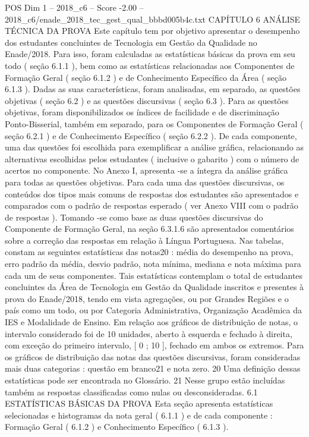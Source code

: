 \begin{textsample}{POS Dim 1 – 2018\_c6 – Score -2.00 – 2018\_c6/enade\_2018\_tec\_gest\_qual\_bbbd005b4c.txt}  \label{ex:f1_pos_247}
CAPÍTULO 6 ANÁLISE TÉCNICA DA PROVA Este capítulo tem por objetivo apresentar o desempenho dos estudantes concluintes de Tecnologia em Gestão da Qualidade no Enade/2018.
Para isso, foram calculadas as estatísticas básicas da prova em seu todo ( seção 6.1.1 ), bem como as estatísticas relacionadas aos Componentes de Formação Geral ( seção 6.1.2 ) e de Conhecimento Específico da Área ( seção 6.1.3 ).
Dadas as suas características, foram analisadas, em separado, as questões objetivas ( seção 6.2 ) e as questões discursivas ( seção 6.3 ).
Para as questões objetivas, foram disponibilizados os índices de facilidade e de discriminação Ponto-Bisserial, também em separado, para os Componentes de Formação Geral ( seção 6.2.1 ) e de Conhecimento Específico ( seção 6.2.2 ).
De cada componente, uma das questões foi escolhida para exemplificar a análise gráfica, relacionando as alternativas escolhidas pelos estudantes ( inclusive o gabarito ) com o número de acertos no componente.
No Anexo I, apresenta -se a íntegra da análise gráfica para todas as questões objetivas.
Para cada uma das questões discursivas, os conteúdos dos tipos mais comuns de respostas dos estudantes são apresentados e comparados com o padrão de respostas esperado ( ver Anexo VIII com o padrão de respostas ).
Tomando -se como base as duas questões discursivas do Componente de Formação Geral, na seção 6.3.1.6 são apresentados comentários sobre a correção das respostas em relação à Língua Portuguesa.
Nas tabelas, constam as seguintes estatísticas das notas20 : média do desempenho na prova, erro padrão da média, desvio padrão, nota mínima, mediana e nota máxima para cada um de seus componentes.
Tais estatísticas contemplam o total de estudantes concluintes da Área de Tecnologia em Gestão da Qualidade inscritos e presentes à prova do Enade/2018, tendo em vista agregações, ou por Grandes Regiões e o país como um todo, ou por Categoria Administrativa, Organização Acadêmica da IES e Modalidade de Ensino.
Em relação aos gráficos de distribuição de notas, o intervalo considerado foi de 10 unidades, aberto à esquerda e fechado à direita, com exceção do primeiro intervalo, [ 0 ; 10 ], fechado em ambos os extremos.
Para os gráficos de distribuição das notas das questões discursivas, foram consideradas mais duas categorias : questão em branco21 e nota zero. 20 Uma definição dessas estatísticas pode ser encontrada no Glossário. 21 Nesse grupo estão incluídas também as respostas classificadas como nulas ou desconsideradas. 6.1 ESTATÍSTICAS BÁSICAS DA PROVA Esta seção apresenta estatísticas selecionadas e histogramas da nota geral ( 6.1.1 ) e de cada componente : Formação Geral ( 6.1.2 ) e Conhecimento Específico ( 6.1.3 ).

\end{textsample}
